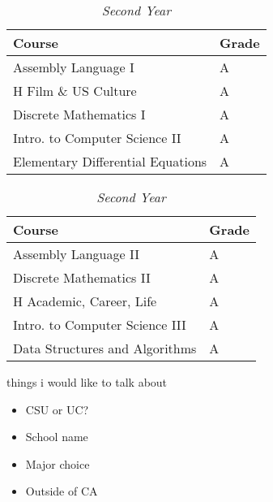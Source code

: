 \documentclass[12pt]{article}
\renewcommand{\it}[1]{\textit{{#1}}}
\begin{document}
\begin{table}[H]
    \centering
    \vspace{-0.8em}
    \caption*{\it{Second Year}}
    \begin{tabular}{l|l}
        Course                                 & Grade \\
        \hline
        Assembly Language I                    & A \\
        H Film \& US Culture                   & A \\
        Discrete Mathematics I                 & A \\
        Intro. to Computer Science II          & A \\
        Elementary Differential Equations      & A \\


    \end{tabular}
    \hfill
    \begin{tabular}{l|l}
        Course                                 & Grade \\
        \hline
        Assembly Language II                   & A \\
        Discrete Mathematics II                & A \\
        H Academic, Career, Life               & A \\
        Intro. to Computer Science III         & A \\
        Data Structures and Algorithms         & A \\
    \end{tabular}
\end{table}




things i would like to talk about
\begin{itemize}[label=$\to$]
    \item CSU or UC?
    \item School name
    \item Major choice
    \item Outside of CA
\end{itemize}
\end{document}
